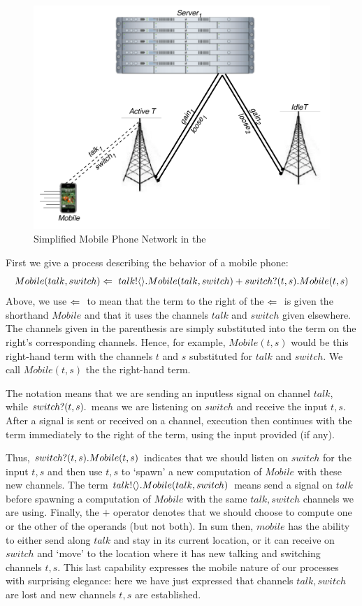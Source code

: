 	\begin{figure}[H]
	\centering
	\includegraphics[scale=0.7]{figures/cell_network_pi.pdf} %
	\caption{Simplified Mobile Phone Network in the \picalc}
	\label{fig_cell_network_pi}
	\end{figure}
	
	First we give a process describing the behavior of a mobile phone:
	\[
		Mobile(talk, switch) \Leftarrow\  {talk}!\langle{}\rangle. Mobile(talk,switch) + {switch}?({t,s}). Mobile(t,s)
	\]
	Above, we use $\Leftarrow\ $ to mean that the term to the right of the $\Leftarrow\ $ is given the shorthand $Mobile$ and that it uses the channels $talk$ and $switch$ given elsewhere.  The channels given in the parenthesis are simply substituted into the term on the right's corresponding channels.  Hence, for example, $Mobile(t,s)$ would be this right-hand term with the channels $t$ and $s$ substituted for $talk$ and $switch$. We call $Mobile(t,s)$ the  the right-hand term.
	
	The notation  means that we are sending an inputless signal on channel $talk$, while ${switch}?({t,s}).$ means we are listening on $switch$ and receive the input $t,s$.  After a signal is sent or received on a channel, execution then continues with the term immediately to the right of the term, using the input provided (if any).  
	
	Thus, ${switch}?({t,s}). Mobile(t,s)$ indicates that we should listen on $switch$ for the input $t,s$ and then use $t,s$ to `spawn' a new computation of $Mobile$ with these new channels. The term ${talk}!\langle{}\rangle. Mobile(talk,switch)$ means send a signal on $talk$ before spawning a computation of $Mobile$ with the same $talk,switch$ channels we are using.  Finally, the $+$ operator denotes that we should choose to compute one or the other of the operands (but not both).  In sum then, $mobile$ has the ability to either send along $talk$ and stay in its current location, or it can receive on $switch$ and `move' to the location where it has new talking and switching channels $t,s$.  This last capability expresses the mobile nature of our processes with surprising elegance: here we have just expressed that channels $talk,switch$ are lost and new channels $t,s$ are established.
	
